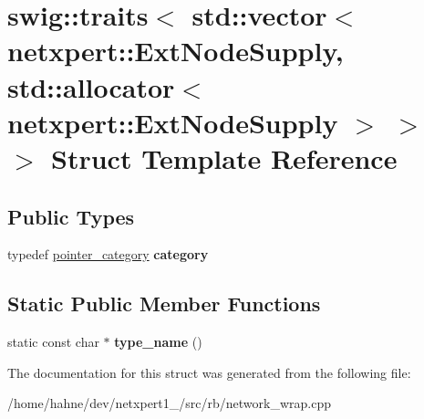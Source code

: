 \hypertarget{structswig_1_1traits_3_01std_1_1vector_3_01netxpert_1_1ExtNodeSupply_00_01std_1_1allocator_3_01n53659bef89ee559386ae044f9e8782a8}{}\section{swig\+:\+:traits$<$ std\+:\+:vector$<$ netxpert\+:\+:Ext\+Node\+Supply, std\+:\+:allocator$<$ netxpert\+:\+:Ext\+Node\+Supply $>$ $>$ $>$ Struct Template Reference}
\label{structswig_1_1traits_3_01std_1_1vector_3_01netxpert_1_1ExtNodeSupply_00_01std_1_1allocator_3_01n53659bef89ee559386ae044f9e8782a8}
\subsection*{Public Types}
\begin{DoxyCompactItemize}
\item 
typedef \hyperlink{structswig_1_1pointer__category}{pointer\+\_\+category} {\bfseries category}\hypertarget{structswig_1_1traits_3_01std_1_1vector_3_01netxpert_1_1ExtNodeSupply_00_01std_1_1allocator_3_01n53659bef89ee559386ae044f9e8782a8_a345a1eea0939b460dae05fbffea35dd8}{}\label{structswig_1_1traits_3_01std_1_1vector_3_01netxpert_1_1ExtNodeSupply_00_01std_1_1allocator_3_01n53659bef89ee559386ae044f9e8782a8_a345a1eea0939b460dae05fbffea35dd8}

\end{DoxyCompactItemize}
\subsection*{Static Public Member Functions}
\begin{DoxyCompactItemize}
\item 
static const char $\ast$ {\bfseries type\+\_\+name} ()\hypertarget{structswig_1_1traits_3_01std_1_1vector_3_01netxpert_1_1ExtNodeSupply_00_01std_1_1allocator_3_01n53659bef89ee559386ae044f9e8782a8_a8b8043f83e574b468104267f807900b5}{}\label{structswig_1_1traits_3_01std_1_1vector_3_01netxpert_1_1ExtNodeSupply_00_01std_1_1allocator_3_01n53659bef89ee559386ae044f9e8782a8_a8b8043f83e574b468104267f807900b5}

\end{DoxyCompactItemize}


The documentation for this struct was generated from the following file\+:\begin{DoxyCompactItemize}
\item 
/home/hahne/dev/netxpert1\+\_/src/rb/network\+\_\+wrap.\+cpp\end{DoxyCompactItemize}
